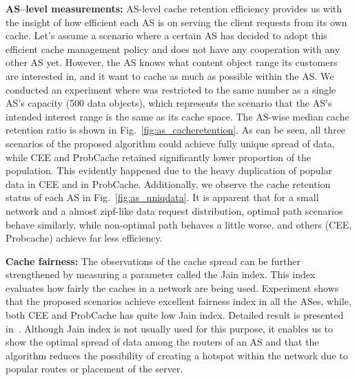\documentclass[article]{elsarticle}
\begin{document}
\textbf{AS--level measurements: }AS-level cache retention efficiency provides us with the insight of how efficient each AS is on serving the client requests from its own cache. Let's assume a scenario where a certain AS has decided to adopt this efficient cache management policy and does not have any cooperation with any other AS yet. However, the AS knows what content object range its customers are interested in, and it want to cache as much as possible within the AS. We conducted an experiment where  was restricted to the same number as a single AS's capacity (500 data objects), which represents the scenario that the AS's intended interest range is the same as its cache space. The AS-wise median cache retention ratio is shown in Fig.~\ref{fig:as_cacheretention}. As can be seen, all three scenarios of the proposed algorithm could achieve fully unique spread of data, while CEE and ProbCache retained significantly lower proportion of the population. This evidently happened due to the heavy duplication of popular data in CEE and in ProbCache. Additionally, we observe the cache retention status of each AS in Fig.~\ref{fig:as_uniqdata}. It is apparent that for a small network and a almost zipf-like data request distribution, optimal path scenarios behave similarly, while non-optimal path behaves a little worse, and others (CEE, Probcache) achieve far less efficiency.

\textbf{Cache fairness: }The observations of the cache spread can be further strengthened by measuring a parameter called the Jain index\cite{jainindex}. This index evaluates how fairly the caches in a network are being used. Experiment shows that the proposed scenarios achieve excellent fairness index in all the ASes, while, both CEE and ProbCache has quite low Jain index. Detailed result is presented in~\cite{myinfocom}. Although Jain index is not usually used for this purpose, it enables us to show the optimal spread of data among the routers of an AS and that the algorithm reduces the possibility of creating a hotspot within the network due to popular routes or placement of the server. 
\end{document}
